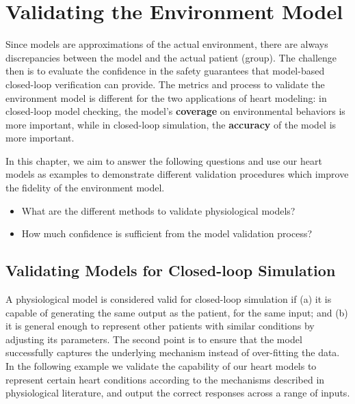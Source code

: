 

\section{Validating the Environment Model}
Since models are approximations of the actual environment, there are always discrepancies between the model and the actual patient (group). The challenge then is to evaluate the confidence in the safety guarantees that model-based closed-loop verification can provide. The metrics and process to validate the environment model is different for the two applications of heart modeling: in closed-loop model checking, the model's \textbf{coverage} on environmental behaviors is more important, while in closed-loop simulation, the \textbf{accuracy} of the model is more important. 

In this chapter, we aim to answer the following questions and use our heart models as examples to demonstrate different validation procedures which improve the fidelity of the environment model. 
\begin{itemize}
	\vspace{-5pt}
	\item What are the different methods to validate physiological models?
	\vspace{-5pt}
	\item How much confidence is sufficient from the model validation process?
\end{itemize}

\subsection{Validating Models for Closed-loop Simulation}
A physiological model is considered valid for closed-loop simulation if (a) it is capable of generating the same output as the patient, for the same input; and (b) it is general enough to represent other patients with similar conditions by adjusting its parameters. The second point is to ensure that the model successfully captures the underlying mechanism instead of over-fitting the data. In the following example we validate the capability of our heart models to represent certain heart conditions according to the mechanisms described in physiological literature, and  output the correct responses across a range of inputs.

